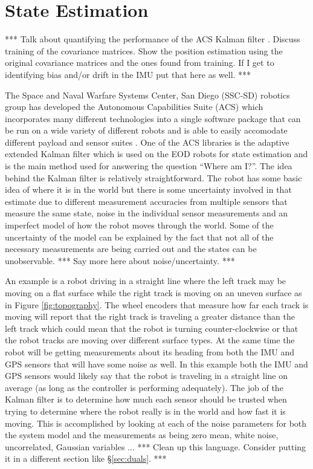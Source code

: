\chapter{State Estimation}
\label{ch:estimation}
*** Talk about quantifying the performance of the ACS Kalman filter \cite{Sights06}. Discuss training of the covariance matrices. Show the position estimation using the original covariance matrices and the ones found from training. If I get to identifying bias and/or drift in the IMU put that here as well. ***

The Space and Naval Warfare Systems Center, San Diego (SSC-SD) robotics group has developed the Autonomous Capabilities Suite (ACS) which incorporates many different technologies into a single software package that can be run on a wide variety of different robots and is able to easily accomodate different payload and sensor suites \cite{Sights06}. One of the ACS libraries is the adaptive extended Kalman filter which is used on the EOD robots for state estimation and is the main method used for answering the question ``Where am I?''. The idea behind the Kalman filter is relatively straightforward. The robot has some basic idea of where it is in the world but there is some uncertainty involved in that estimate due to different measurement accuracies from multiple sensors that measure the same state, noise in the individual sensor measurements and an imperfect model of how the robot moves through the world. Some of the uncertainty of the model can be explained by the fact that not all of the necessary measurements are being carried out and the states can be unobservable. *** Say more here about noise/uncertainty. ***

An example is a robot driving in a straight line where the left track may be moving on a flat surface while the right track is moving on an uneven surface as in Figure \ref{fig:topography}. The wheel encoders that measure how far each track is moving will report that the right track is traveling a greater distance than the left track which could mean that the robot is turning counter-clockwise or that the robot tracks are moving over different surface types. At the same time the robot will be getting measurements about its heading from both the IMU and GPS sensors that will have some noise as well. In this example both the IMU and GPS sensors would likely say that the robot is traveling in a straight line on average (as long as the controller is performing adequately). The job of the Kalman filter is to determine how much each sensor should be trusted when trying to determine where the robot really is in the world and how fast it is moving. This is accomplished by looking at each of the noise parameters for both the system model and the measurements as being zero mean, white noise, uncorrelated, Gaussian variables ... *** Clean up this language. Consider putting it in a different section like \S\ref{sec:duals}. ***

